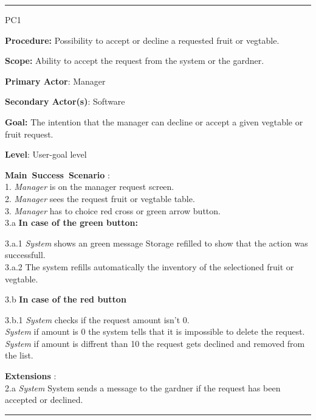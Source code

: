\vspace{0.5cm}
\hrule
\hfill \break
\begin{lyxlist}{PC1}
\small{
\item [\textbf{Procedure:}] Possibility to accept or decline a requested fruit
or vegtable.
\item [\textbf{Scope:}] Ability to accept the request from the system or the
gardner.
\item [\textbf{Primary Actor}:] Manager
\item [\textbf{Secondary Actor(s)}:] Software
\item [\textbf{Goal:}] The intention that the manager can decline or accept a
given vegtable or fruit request.
\item [\textbf{Level}:] User-goal level
\item [\textbf{Main~Success~Scenario}]:\\
1. \emph{Manager} is on the manager request screen. \\
2. \emph{Manager} sees the request fruit or vegtable table.\\
3. \emph{Manager} has to choice red cross or green arrow button.\\
3.a \textbf{In case of the green button:}
 \begin{Tab}{2em} 3.a.1 \emph{System} shows an green message Storage refilled to
 show that the action was successfull.\\
 3.a.2 The system refills automatically the inventory of the selectioned fruit
 or vegtable.
  \end{Tab}
3.b \textbf{In case of the red button}
\begin{Tab}{2em} 3.b.1 \emph{System} checks if the request amount isn't 0.\\
\emph{System} if amount is 0 the system tells that it is impossible to delete
the request.
\emph{System} if amount is diffrent than 10 the request gets declined and
removed from the list.
\end{Tab}
\item [\textbf{Extensions}]:\\
2.a  \emph{System} System sends a message to the gardner if the request has
been accepted or declined.\\
}
\end{lyxlist}
\hrule
\vspace{0.5cm}

\break


